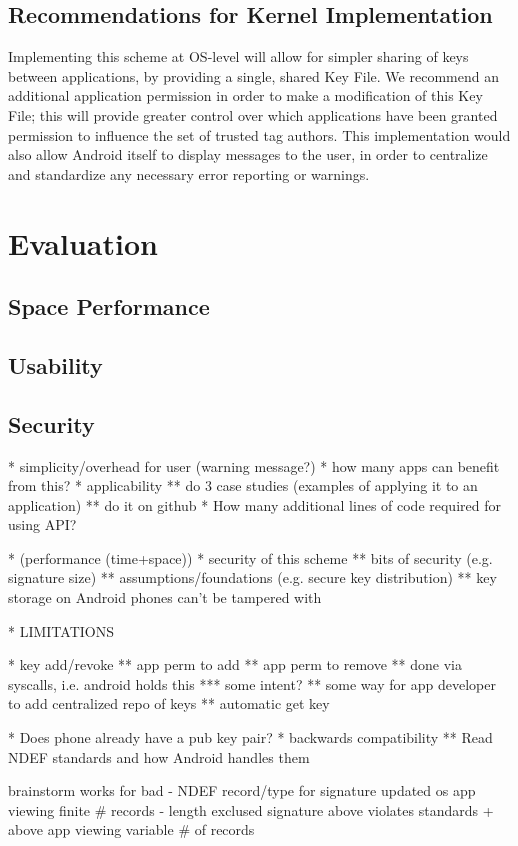 \documentclass[12pt]{article}
\begin{document}
\subsection{Recommendations for Kernel Implementation}
Implementing this scheme at OS-level will allow for simpler sharing of keys between applications, by providing a single, shared Key File.
We recommend an additional application permission in order to make a modification of this Key File; this will provide greater control over which applications have been granted permission to influence the set of trusted tag authors.
This implementation would also allow Android itself to display messages to the user, in order to centralize and standardize any necessary error reporting or warnings.



\section{Evaluation}
\subsection{Space Performance}
\subsection{Usability}
\subsection{Security}
* simplicity/overhead for user (warning message?)
* how many apps can benefit from this?
* applicability
** do 3 case studies (examples of applying it to an application)
** do it on github
* How many additional lines of code required for using API?

* (performance (time+space))
* security of this scheme
** bits of security (e.g. signature size)
** assumptions/foundations (e.g. secure key distribution)
** key storage on Android phones can't be tampered with

* LIMITATIONS

* key add/revoke
** app perm to add
** app perm to remove
** done via syscalls, i.e. android holds this
*** some intent?
** some way for app developer to add centralized repo of keys
** automatic get key

* Does phone already have a pub key pair?
* backwards compatibility
** Read NDEF standards and how Android handles them

brainstorm                         works for                           bad
- NDEF record/type for signature   updated os
                                   app viewing finite \# records
- length exclused signature        above                               violates standards
  + above                          app viewing variable \# of records   
\end{document}
